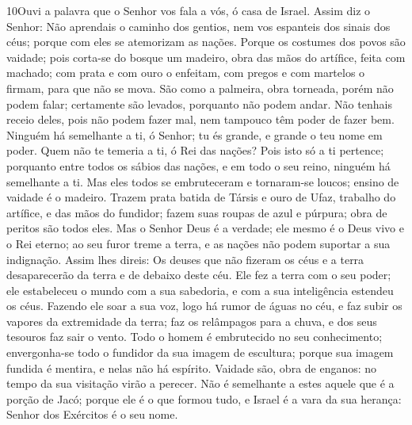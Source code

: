 \medskip

\lettrine{10} Ouvi a palavra que o Senhor vos fala a vós, ó
casa de Israel. Assim diz o Senhor: Não aprendais o caminho dos
gentios, nem vos espanteis dos sinais dos céus; porque com eles se
atemorizam as nações. Porque os costumes dos povos são vaidade;
pois corta-se do bosque um madeiro, obra das mãos do artífice, feita
com machado; com prata e com ouro o enfeitam, com pregos e com
martelos o firmam, para que não se mova. São como a palmeira,
obra torneada, porém não podem falar; certamente são levados,
porquanto não podem andar. Não tenhais receio deles, pois não podem
fazer mal, nem tampouco têm poder de fazer bem. Ninguém há
semelhante a ti, ó Senhor; tu és grande, e grande o teu nome em
poder. Quem não te temeria a ti, ó Rei das nações? Pois isto só
a ti pertence; porquanto entre todos os sábios das nações, e em todo
o seu reino, ninguém há semelhante a ti. Mas eles todos se
embruteceram e tornaram-se loucos; ensino de vaidade é o madeiro.
Trazem prata batida de Társis e ouro de Ufaz, trabalho do
artífice, e das mãos do fundidor; fazem suas roupas de azul e
púrpura; obra de peritos são todos eles. Mas o Senhor Deus é
a verdade; ele mesmo é o Deus vivo e o Rei eterno; ao seu furor
treme a terra, e as nações não podem suportar a sua indignação.
Assim lhes direis: Os deuses que não fizeram os céus e a
terra desaparecerão da terra e de debaixo deste céu. Ele fez
a terra com o seu poder; ele estabeleceu o mundo com a sua
sabedoria, e com a sua inteligência estendeu os céus. Fazendo
ele soar a sua voz, logo há rumor de águas no céu, e faz subir os
vapores da extremidade da terra; faz os relâmpagos para a chuva, e
dos seus tesouros faz sair o vento. Todo o homem é
embrutecido no seu conhecimento; envergonha-se todo o fundidor da
sua imagem de escultura; porque sua imagem fundida é mentira, e
nelas não há espírito. Vaidade são, obra de enganos: no tempo
da sua visitação virão a perecer. Não é semelhante a estes
aquele que é a porção de Jacó; porque ele é o que formou tudo, e
Israel é a vara da sua herança: Senhor dos Exércitos é o seu nome.

